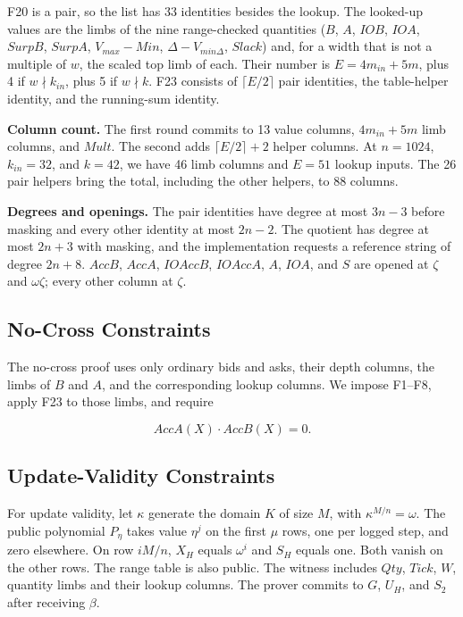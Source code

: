F20 is a pair, so the list has 33 identities besides the lookup. The looked-up values are the limbs of the nine range-checked quantities (\(B\), \(A\), \(IOB\), \(IOA\), \(SurpB\), \(SurpA\), \(V_{max} - Min\), \(\Delta - V_{min\Delta}\), \(Slack\)) and, for a width that is not a multiple of \(w\), the scaled top limb of each. Their number is \(E = 4 m_{in} + 5m\), plus 4 if \(w \nmid k_{in}\), plus 5 if \(w \nmid k\). F23 consists of \(\lceil E/2 \rceil\) pair identities, the table-helper identity, and the running-sum identity.

\textbf{Column count.} The first round commits to 13 value columns, \(4m_{in}+5m\) limb columns, and \(Mult\). The second adds \(\lceil E/2\rceil+2\) helper columns. At \(n=1024\), \(k_{in}=32\), and \(k=42\), we have 46 limb columns and \(E=51\) lookup inputs. The 26 pair helpers bring the total, including the other helpers, to 88 columns.

\textbf{Degrees and openings.} The pair identities have degree at most \(3n - 3\) before masking and every other identity at most \(2n - 2\). The quotient has degree at most \(2n + 3\) with masking, and the implementation requests a reference string of degree \(2n + 8\). \(AccB\), \(AccA\), \(IOAccB\), \(IOAccA\), \(A\), \(IOA\), and \(S\) are opened at \(\zeta\) and \(\omega\zeta\); every other column at \(\zeta\).

\subsection{No-Cross Constraints}

The no-cross proof uses only ordinary bids and asks, their depth columns, the limbs of \(B\) and \(A\), and the corresponding lookup columns. We impose F1--F8, apply F23 to those limbs, and require

\[AccA(X) \cdot AccB(X) = 0.\]

\subsection{Update-Validity Constraints}

For update validity, let \(\kappa\) generate the domain \(K\) of size \(M\), with \(\kappa^{M/n}=\omega\). The public polynomial \(P_\eta\) takes value \(\eta^j\) on the first \(\mu\) rows, one per logged step, and zero elsewhere. On row \(iM/n\), \(X_H\) equals \(\omega^i\) and \(S_H\) equals one. Both vanish on the other rows. The range table is also public. The witness includes \(Qty\), \(Tick\), \(W\), quantity limbs and their lookup columns. The prover commits to \(G\), \(U_H\), and \(S_2\) after receiving \(\beta\).

